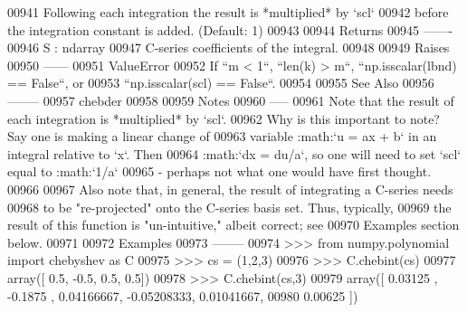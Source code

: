 \begin{DoxyCode}
00941 \textcolor{stringliteral}{        Following each integration the result is *multiplied* by `scl`}
00942 \textcolor{stringliteral}{        before the integration constant is added. (Default: 1)}
00943 \textcolor{stringliteral}{}
00944 \textcolor{stringliteral}{    Returns}
00945 \textcolor{stringliteral}{    -------}
00946 \textcolor{stringliteral}{    S : ndarray}
00947 \textcolor{stringliteral}{        C-series coefficients of the integral.}
00948 \textcolor{stringliteral}{}
00949 \textcolor{stringliteral}{    Raises}
00950 \textcolor{stringliteral}{    ------}
00951 \textcolor{stringliteral}{    ValueError}
00952 \textcolor{stringliteral}{        If ``m < 1``, ``len(k) > m``, ``np.isscalar(lbnd) == False``, or}
00953 \textcolor{stringliteral}{        ``np.isscalar(scl) == False``.}
00954 \textcolor{stringliteral}{}
00955 \textcolor{stringliteral}{    See Also}
00956 \textcolor{stringliteral}{    --------}
00957 \textcolor{stringliteral}{    chebder}
00958 \textcolor{stringliteral}{}
00959 \textcolor{stringliteral}{    Notes}
00960 \textcolor{stringliteral}{    -----}
00961 \textcolor{stringliteral}{    Note that the result of each integration is *multiplied* by `scl`.}
00962 \textcolor{stringliteral}{    Why is this important to note?  Say one is making a linear change of}
00963 \textcolor{stringliteral}{    variable :math:`u = ax + b` in an integral relative to `x`.  Then}
00964 \textcolor{stringliteral}{    :math:`dx = du/a`, so one will need to set `scl` equal to :math:`1/a`}
00965 \textcolor{stringliteral}{    - perhaps not what one would have first thought.}
00966 \textcolor{stringliteral}{}
00967 \textcolor{stringliteral}{    Also note that, in general, the result of integrating a C-series needs}
00968 \textcolor{stringliteral}{    to be "re-projected" onto the C-series basis set.  Thus, typically,}
00969 \textcolor{stringliteral}{    the result of this function is "un-intuitive," albeit correct; see}
00970 \textcolor{stringliteral}{    Examples section below.}
00971 \textcolor{stringliteral}{}
00972 \textcolor{stringliteral}{    Examples}
00973 \textcolor{stringliteral}{    --------}
00974 \textcolor{stringliteral}{    >>> from numpy.polynomial import chebyshev as C}
00975 \textcolor{stringliteral}{    >>> cs = (1,2,3)}
00976 \textcolor{stringliteral}{    >>> C.chebint(cs)}
00977 \textcolor{stringliteral}{    array([ 0.5, -0.5,  0.5,  0.5])}
00978 \textcolor{stringliteral}{    >>> C.chebint(cs,3)}
00979 \textcolor{stringliteral}{    array([ 0.03125   , -0.1875    ,  0.04166667, -0.05208333,  0.01041667,}
00980 \textcolor{stringliteral}{            0.00625   ])}

\end{DoxyCode}
